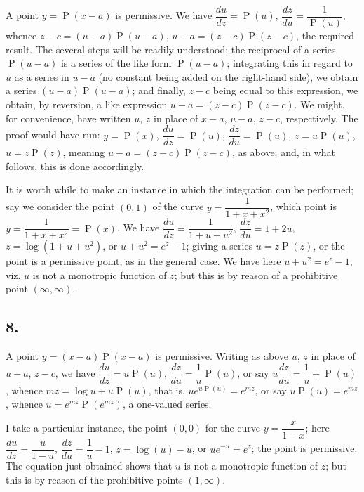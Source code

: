 \documentclass[11pt,a4paper]{article}
\theoremstyle{definition}
\DeclareMathOperator{\Pf}{P}
\begin{document}
A point $y = \Pf(x - a)$ is permissive. We have $\dfrac{du}{dz} = \Pf(u)$, $\dfrac{dz}{du} = \dfrac{1}{\Pf(u)}$, whence $z - c = (u - a)\Pf(u - a)$, $u - a = (z - c)\Pf(z - c)$, the required result. The several steps will be readily understood; the reciprocal of a series $\Pf(u - a)$ is a series of the like form $\Pf(u - a)$; integrating this in regard to $u$ as a series in $u - a$ (no constant being added on the right-hand side), we obtain a series $(u - a)\Pf(u - a)$; and finally, $z - c$ being equal to this expression, we obtain, by reversion, a like expression $u - a = (z - c)\Pf(z - c)$. We might, for convenience, have written $u$, $z$ in place of $x - a$, $u - a$, $z - c$, respectively. The proof would have run: $y = \Pf(x)$, $\dfrac{du}{dz} = \Pf(u)$, $\dfrac{dz}{du} = \Pf(u)$, $z = u\Pf(u)$, $u = z\Pf(z)$, meaning $u - a = (z - c)\Pf(z - c)$, as above; and, in what follows, this is done accordingly.

It is worth while to make an instance in which the integration can be performed; say we consider the point $(0, 1)$ of the curve $y = \dfrac{1}{1 + x + x^2}$, which point is $y = \dfrac{1}{1 + x + x^2} = \Pf(x)$. We have $\dfrac{du}{dz} = \dfrac{1}{1 + u + u^2}$, $\dfrac{dz}{du} = 1 + 2u$, $z = \log(1 + u + u^2)$, or $u + u^2 = e^z - 1$; giving a series $u = z\Pf(z)$, or the point is a permissive point, as in the general case. We have here $u + u^2 = e^z - 1$, viz. $u$ is not a monotropic function of $z$; but this is by reason of a prohibitive point $(\infty, \infty)$.

\subsection*{8.}

A point $y = (x - a)\Pf(x - a)$ is permissive. Writing as above $u$, $z$ in place of $u - a$, $z - c$, we have $\dfrac{du}{dz} = u\Pf(u)$, $\dfrac{dz}{du} = \dfrac{1}{u}\Pf(u)$, or say $u\dfrac{dz}{du} = \dfrac{1}{u} + \Pf(u)$, whence $mz = \log u + u\Pf(u)$, that is, $ue^{u\Pf(u)} = e^{mz}$, or say $u\Pf(u) = e^{mz}$, whence $u = e^{mz}\Pf(e^{mz})$, a one-valued series.

I take a particular instance, the point $(0, 0)$ for the curve $y = \dfrac{x}{1 - x}$; here $\dfrac{du}{dz} = \dfrac{u}{1 - u}$, $\dfrac{dz}{du} = \dfrac{1}{u} - 1$, $z = \log(u) - u$, or $ue^{-u} = e^z$; the point is permissive. The equation just obtained shows that $u$ is not a monotropic function of $z$; but this is by reason of the prohibitive points $(1, \infty)$.
\end{document}
